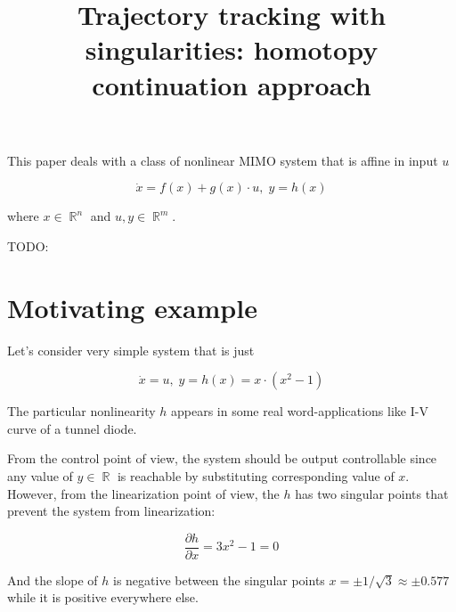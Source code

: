 \documentclass[11pt,american]{article}
\title{Trajectory tracking with singularities: homotopy continuation approach}
\DeclareMathOperator{\R}{\mathbb{R}}
\begin{document}
\maketitle
This paper deals with a class of nonlinear MIMO system that is affine in input $u$

\begin{equation}
\dot x = f(x) + g(x) \cdot u, \; y = h(x)
\end{equation}

where $x \in \R^n$ and $u,y \in \R^m$.

TODO:

\section{Motivating example}

Let's consider very simple system that is just 

\begin{equation}\label{toy_example}
\dot x = u, \; y = h(x) = x \cdot (x^2 - 1)
\end{equation}


The particular nonlinearity $h$ appears in some real word-applications like I-V curve of a tunnel diode.

From the control point of view, the system should be output controllable since any value of $y \in \R$ is reachable by substituting corresponding value of $x$.
However, from the linearization point of view, the $h$ has two singular points that prevent the system from linearization:

\begin{equation}
\frac{\partial h}{\partial x} = 3 x^2 - 1 = 0 
\end{equation}

And the slope of $h$ is negative between the singular points $x = \pm 1/\sqrt{3} \approx \pm 0.577$ while it is positive everywhere else.
\end{document}
